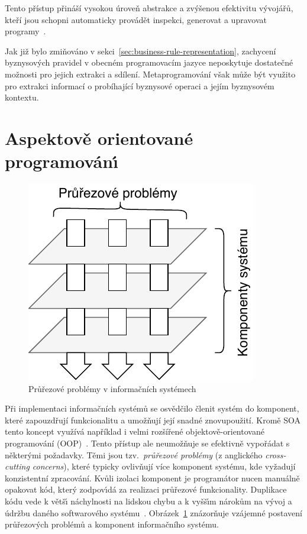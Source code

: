 Tento přístup přináší vysokou úroveň abstrakce a zvýšenou efektivitu
vývojářů, kteří jsou schopni automaticky provádět inspekci, generovat a upravovat
programy~\cite{sheard2001accomplishments}.

Jak již bylo zmiňováno v sekci~\ref{sec:business-rule-representation}, zachycení byznysových
pravidel v obecném programovacím jazyce neposkytuje dostatečné možnosti pro jejich extrakci
a sdílení. Metaprogramování však může být využito pro extrakci informací o probíhající
byznysové operaci a jejím byznysovém kontextu.

\section{Aspektově orientované programován\'{\i}}\label{sec:aop}

\begin{figure}[t]
    \centering
    \includegraphics[keepaspectratio=true, width=0.35\linewidth]{figures/cross-cutting.pdf}
    \caption{Průřezové problémy v informačních systémech}
    \label{fig:cross-cutting}
\end{figure}

Při implementaci informačních systémů se osvědčilo členit systém do komponent, které
zapouzdřují funkcionalitu a umožňují její snadné znovupoužití. Kromě \gls{SOA} tento koncept
využívá například i velmi rozšířené objektově-orientované programování (\gls{OOP})~\cite{rentsch1982object}.
Tento přístup ale neumožňuje se efektivně vypořádat s některými požadavky.
Těmi jsou tzv.~\textit{průřezové problémy} (z anglického \textit{cross-cutting concerns}),
které typicky ovlivňují více komponent systému, kde vyžadují konzistentní zpracování.
Kvůli izolaci komponent je programátor nucen manuálně opakovat
kód, kter\'y zodpov\'{\i}dá za realizaci průřezové funkcionality. Duplikace kódu
vede k větš\'{\i} náchylnosti na lidskou chybu a k vyšš\'{\i}m nárokům na v\'yvoj
a údržbu daného softwarového systému~\cite{fowler1999refactoring}.
Obrázek~\ref{fig:cross-cutting} znázorňuje vzájemné postavení průřezových
problémů a komponent informačního systému.


